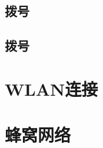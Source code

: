 
\subsection{拨号}


\subsection{拨号}


\section{WLAN连接}\label{sec:WLAN连接}


\section{蜂窝网络}


\endinput